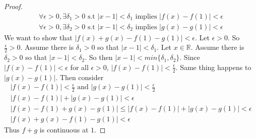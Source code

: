 \documentclass{article}
\theoremstyle{claim}
\theoremstyle{definition}
\begin{document}
\begin{enumerate}
\begin{proof}
            \begin{gather*}
                \forall \epsilon > 0, \exists \delta_1 > 0 \text{ s.t } |x - 1| < \delta_1 \text{ implies } |f(x) - f(1)| < \epsilon\\
                \forall \epsilon > 0, \exists \delta_2 > 0 \text{ s.t } |x - 1| < \delta_2 \text{ implies } |g(x) - g(1)| < \epsilon
            \end{gather*}
            We want to show that $|f(x) + g(x) - f(1) - g(1)| < \epsilon$.
            Let $\epsilon > 0$. So $\frac{\epsilon}{2} > 0$. Assume there is $\delta_1 > 0$ so that $|x - 1| < \delta_1$. Let $x \in \mathbb{R}$. Assume there is $\delta_2 > 0$ so that $|x - 1| < \delta_2$. So then $|x - 1| < min\{\delta_1, \delta_2\}$. Since $|f(x) - f(1)| < \epsilon$ for all $\epsilon > 0$, $|f(x) - f(1)| < \frac{\epsilon}{2}$. Same thing happens to $|g(x) - g(1)|$. Then consider
            \begin{gather*}
                |f(x) - f(1)| < \frac{\epsilon}{2} \text{ and } |g(x) - g(1)| < \frac{\epsilon}{2}\\
                |f(x) - f(1)| + |g(x) - g(1)| < \epsilon\\
                |f(x) - f(1) + g(x) - g(1)| \le |f(x) - f(1)| + |g(x) - g(1)| < \epsilon\\
                |f(x) + g(x) - f(1) - g(1)| < \epsilon
            \end{gather*}
            Thus $f + g$ is continuous at $1$.
        \end{proof}
\end{enumerate}
\end{document}
